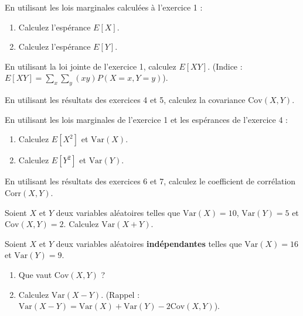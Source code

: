 
\begin{exercicebox}
En utilisant les lois marginales calculées à l'exercice 1 :
\begin{enumerate}
    \item Calculez l'espérance $E[X]$.
    \item Calculez l'espérance $E[Y]$.
\end{enumerate}
\end{exercicebox}

\begin{exercicebox}
En utilisant la loi jointe de l'exercice 1, calculez $E[XY]$.
(Indice : $E[XY] = \sum_x \sum_y (xy) P(X=x, Y=y)$).
\end{exercicebox}

\begin{exercicebox}
En utilisant les résultats des exercices 4 et 5, calculez la covariance $\text{Cov}(X,Y)$.
\end{exercicebox}

\begin{exercicebox}
En utilisant les lois marginales de l'exercice 1 et les espérances de l'exercice 4 :
\begin{enumerate}
    \item Calculez $E[X^2]$ et $\text{Var}(X)$.
    \item Calculez $E[Y^2]$ et $\text{Var}(Y)$.
\end{enumerate}
\end{exercicebox}

\begin{exercicebox}
En utilisant les résultats des exercices 6 et 7, calculez le coefficient de corrélation $\text{Corr}(X,Y)$.
\end{exercicebox}


\begin{exercicebox}
Soient $X$ et $Y$ deux variables aléatoires telles que $\text{Var}(X) = 10$, $\text{Var}(Y) = 5$ et $\text{Cov}(X,Y) = 2$.
Calculez $\text{Var}(X+Y)$.
\end{exercicebox}

\begin{exercicebox}
Soient $X$ et $Y$ deux variables aléatoires \textbf{indépendantes} telles que $\text{Var}(X) = 16$ et $\text{Var}(Y) = 9$.
\begin{enumerate}
    \item Que vaut $\text{Cov}(X,Y)$ ?
    \item Calculez $\text{Var}(X-Y)$. (Rappel : $\text{Var}(X-Y) = \text{Var}(X) + \text{Var}(Y) - 2\text{Cov}(X,Y)$).
\end{enumerate}
\end{exercicebox}

